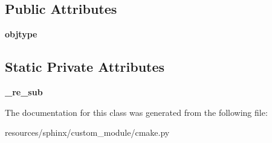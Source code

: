 \subsection*{Public Attributes}
\begin{DoxyCompactItemize}
\item 
{\bfseries objtype}\hypertarget{classcmake_1_1CMakeObject_a8e5fc4c75fdfb8b88fcbe6c37678cba5}{}\label{classcmake_1_1CMakeObject_a8e5fc4c75fdfb8b88fcbe6c37678cba5}

\end{DoxyCompactItemize}
\subsection*{Static Private Attributes}
\begin{DoxyCompactItemize}
\item 
{\bfseries \+\_\+re\+\_\+sub}\hypertarget{classcmake_1_1CMakeObject_a4a5c13fecd7ac9c0433b126f37a5806c}{}\label{classcmake_1_1CMakeObject_a4a5c13fecd7ac9c0433b126f37a5806c}

\end{DoxyCompactItemize}


The documentation for this class was generated from the following file\+:\begin{DoxyCompactItemize}
\item 
resources/sphinx/custom\+\_\+module/cmake.\+py\end{DoxyCompactItemize}
